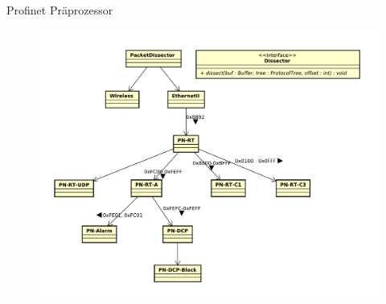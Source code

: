 \begin{frame}{Profinet Präprozessor}
    \begin{figure}
    	\centering
    	\includegraphics[height=0.8\textheight]{./images/dissector/7.pdf}
    \end{figure}
\end{frame}    

